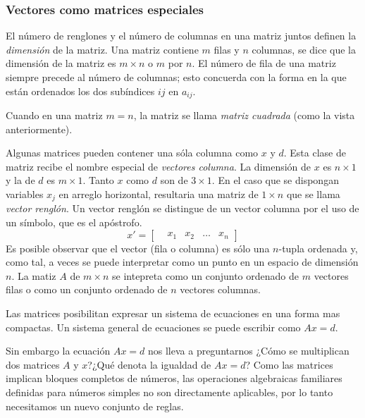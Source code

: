 \subsubsection{Vectores como matrices especiales}

El número de renglones y el número de columnas en una matriz juntos definen la \textit{dimensión} de la matriz. Una matriz contiene \(m\) filas y \(n\) columnas, se dice que la dimensión de la matriz es \(m \times n\) o \(m\) por \(n\). El número de fila de una matriz siempre precede al número de columnas; esto concuerda con la forma en la que están ordenados los dos subíndices \(ij\) en \(a_{ij}\).

Cuando en una matriz \(m = n\), la matriz se llama \textit{matriz cuadrada} (como la vista anteriormente).

Algunas matrices pueden contener una sóla columna como \(x\) y \(d\). Esta clase de matriz recibe el nombre especial de \textit{vectores columna}. La dimensión de \(x\) es \(n \times 1\) y la de \(d\) es \(m \times 1\). Tanto \(x\) como \(d\) son de \(3 \times 1\). En el caso que se dispongan variables \(x_j\) en arreglo horizontal, resultaria una matriz de \(1 \times n\) que se llama \textit{vector renglón}. Un vector renglón se distingue de un vector columna por el uso de un símbolo, que es el apóstrofo.
\[
x' = \begin{bmatrix}
    & x_1 & x_2 & \dots & x_n
\end{bmatrix}
\]
Es posible observar que el vector (fila o columna) es sólo una \(n\)-tupla ordenada y, como tal, a veces se puede interpretar como un punto en un espacio de dimensión \(n\). La matiz \(A\) de \(m \times n\) se intepreta como un conjunto ordenado de \(m\) vectores filas o como un conjunto ordenado de \(n\) vectores columnas.

Las matrices posibilitan expresar un sistema de ecuaciones en una forma mas compactas. Un sistema general de ecuaciones se puede escribir como \(Ax = d\).

Sin embargo la ecuación \(Ax = d\) nos lleva a preguntarnos ¿Cómo se multiplican dos matrices \(A\) y \(x\)?¿Qué denota la igualdad de \(Ax=d\)? Como las matrices implican bloques completos de números, las operaciones algebraicas familiares definidas para números simples no son directamente aplicables, por lo tanto necesitamos un nuevo conjunto de reglas.

